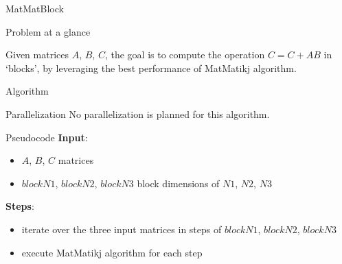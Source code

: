 \begin{chapter}{MatMatBlock}
    \begin{section}{Problem at a glance}
        \par Given matrices $A$, $B$, $C$, the goal is to compute the  operation $C = C + AB$ in `blocks', by leveraging the best performance of MatMatikj algorithm.
    \end{section}
    \begin{section}{Algorithm}
        \begin{subsection}{Parallelization}
            No parallelization is planned for this algorithm.
        \end{subsection}
        \begin{subsection}{Pseudocode}
            \textbf{Input}:
            \begin{itemize}
                \item $A$, $B$, $C$ matrices
                \item $blockN1$, $blockN2$, $blockN3$ block dimensions of $N1$, $N2$, $N3$
            \end{itemize}
            \textbf{Steps}:
            \begin{itemize}
                \item iterate over the three input matrices in steps of $blockN1$, $blockN2$, $blockN3$
                \item execute MatMatikj algorithm for each step
            \end{itemize}
            
        \end{subsection}
    \end{section}
\end{chapter}